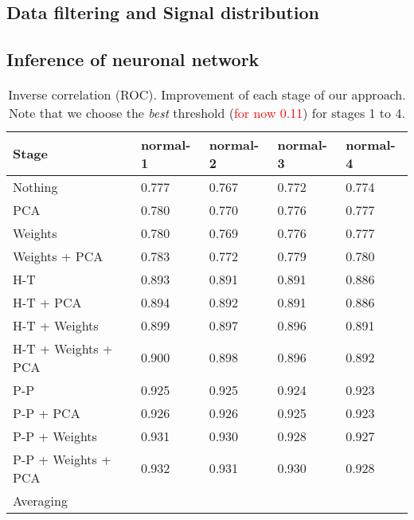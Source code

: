 \documentclass[wcp]{jmlr}
\begin{document}
\subsection{Data filtering and Signal distribution}

\subsection{Inference of neuronal network}


\begin{table}[htb]
\centering
\caption{Inverse correlation (ROC). Improvement of each stage of our approach. Note that we choose the
         \textit{best} threshold (\textcolor{red}{for now 0.11}) for stages 1 to 4.}
\begin{tabular}{*{5}{l}}
\toprule
Stage               & normal-1 & normal-2 & normal-3 & normal-4 \\
\midrule
Nothing             & 0.777 & 0.767 & 0.772 & 0.774 \\
PCA                 & 0.780 & 0.770 & 0.776 & 0.777 \\
Weights             & 0.780 & 0.769 & 0.776 & 0.777 \\
Weights + PCA       & 0.783 & 0.772 & 0.779 & 0.780 \\
H-T                 & 0.893 & 0.891 & 0.891 & 0.886 \\
H-T + PCA           & 0.894 & 0.892 & 0.891 & 0.886 \\
H-T + Weights       & 0.899 & 0.897 & 0.896 & 0.891 \\
H-T + Weights + PCA & 0.900 & 0.898 & 0.896 & 0.892 \\
P-P                 & 0.925 & 0.925 & 0.924 & 0.923 \\
P-P + PCA           & 0.926 & 0.926 & 0.925 & 0.923 \\
P-P + Weights       & 0.931 & 0.930 & 0.928 & 0.927 \\
P-P + Weights + PCA & 0.932 & 0.931 & 0.930 & 0.928 \\
Averaging           & & & & \\
\bottomrule
\end{tabular}
\end{table}
\end{document}
